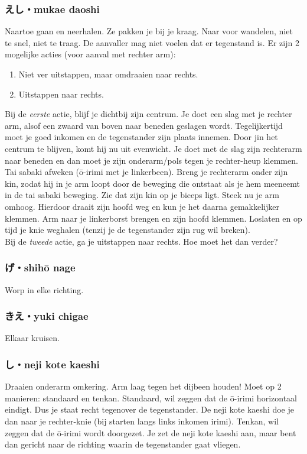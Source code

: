 \subsubsection{えし・mukae daoshi}
Naartoe gaan en neerhalen. Ze pakken je bij je kraag. Naar voor wandelen, niet te snel, niet te traag. De aanvaller mag niet voelen dat er tegenstand is. Er zijn 2 mogelijke acties (voor aanval met rechter arm):\\
\begin{enumerate}
    \item{Niet ver uitstappen, maar omdraaien naar rechts.}
    \item{Uitstappen naar rechts.}
\end{enumerate}
Bij de \textit{eerste} actie, blijf je dichtbij zijn centrum. Je doet een slag met je rechter arm, alsof een zwaard van boven naar beneden geslagen wordt. Tegelijkertijd moet je goed inkomen en de tegenstander zijn plaats innemen. Door jin het centrum te blijven, komt hij nu uit evenwicht. Je doet met de slag zijn rechterarm naar beneden en dan moet je zijn onderarm/pols tegen je rechter-heup klemmen. Tai sabaki afweken (\={o}-irimi met je linkerbeen). Breng je rechterarm onder zijn kin, zodat hij in je arm loopt door de beweging die ontstaat als je hem meeneemt in de tai sabaki beweging. Zie dat zijn kin op je biceps ligt. Steek nu je arm omhoog. Hierdoor draait zijn hoofd weg en kun je het daarna gemakkelijker klemmen. Arm naar je linkerborst brengen en zijn hoofd klemmen. Loslaten en op tijd je knie weghalen (tenzij je de tegenstander zijn rug wil breken).\\
Bij de \textit{tweede} actie, ga je uitstappen naar rechts. Hoe moet het dan verder?


\subsubsection{げ・shih\={o} nage}
Worp in elke richting.

\subsubsection{きえ・yuki chigae}
Elkaar kruisen.

\subsubsection{し・neji kote kaeshi}
Draaien onderarm omkering.
Arm laag tegen het dijbeen houden!
Moet op 2 manieren: standaard en tenkan.
Standaard, wil zeggen dat de \={o}-irimi horizontaal eindigt. Dus je staat recht tegenover de tegenstander. De neji kote kaeshi doe je dan naar je rechter-knie (bij starten langs links inkomen irimi). 
Tenkan, wil zeggen dat de \={o}-irimi wordt doorgezet. Je zet de neji kote kaeshi aan, maar bent dan gericht naar de richting waarin de tegenstander gaat vliegen.

